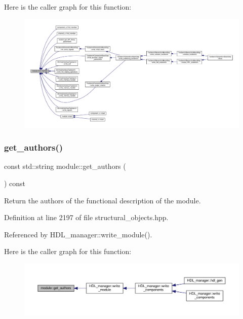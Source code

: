 Here is the caller graph for this function\+:
\nopagebreak
\begin{figure}[H]
\begin{center}
\leavevmode
\includegraphics[width=350pt]{d0/dd3/classmodule_aa9d6bab510486b47eef4c0cd37bc6126_icgraph}
\end{center}
\end{figure}
\mbox{\label{classmodule_ab3c59207efa504ac80ccb857947b93f6}} 
\subsubsection{\texorpdfstring{get\+\_\+authors()}{get\_authors()}}
{\footnotesize\ttfamily const std\+::string module\+::get\+\_\+authors (\begin{DoxyParamCaption}{ }\end{DoxyParamCaption}) const\hspace{0.3cm}{\ttfamily [inline]}}



Return the authors of the functional description of the module. 



Definition at line 2197 of file structural\+\_\+objects.\+hpp.



Referenced by H\+D\+L\+\_\+manager\+::write\+\_\+module().

Here is the caller graph for this function\+:
\nopagebreak
\begin{figure}[H]
\begin{center}
\leavevmode
\includegraphics[width=350pt]{d0/dd3/classmodule_ab3c59207efa504ac80ccb857947b93f6_icgraph}
\end{center}
\end{figure}
\mbox{\label{classmodule_a1890ad41f7972ff59dfaf374332e9ba7}} 
